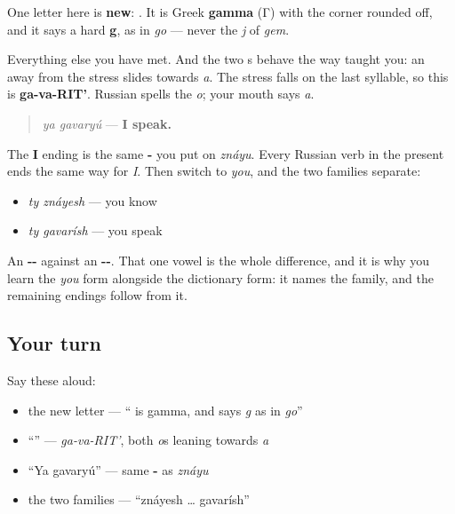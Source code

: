 One letter here is \textbf{new}: \textbf{}. It is Greek \textbf{gamma} (Γ) with the corner rounded off, and it says a hard \textbf{g}, as in \emph{go} — never the \emph{j} of \emph{gem}.

Everything else you have met. And the two \textbf{}s behave the way \emph{} taught you: an \textbf{} away from the stress slides towards \emph{a}. The stress falls on the last syllable, so this is \textbf{ga-va-RIT'}. Russian spells the \emph{o}; your mouth says \emph{a}.

\begin{grammarlens}[title={Grammar Lens: verbs come in two families}]
\begin{quote}
\emph{ya gavaryú} — \textbf{I speak.}
\end{quote}

The \textbf{I} ending is the same \textbf{-} you put on \emph{znáyu}. Every Russian verb in the present ends the same way for \emph{I}. Then switch to \emph{you}, and the two families separate:

\begin{itemize}
\raggedright
  \item \emph{ty znáyesh} — you know
  \item \emph{ty gavarísh} — you speak
\end{itemize}

An \textbf{--} against an \textbf{--}. That one vowel is the whole difference, and it is why you learn the \emph{you} form alongside the dictionary form: it names the family, and the remaining endings follow from it.
\end{grammarlens}

\subsection*{Your turn}
Say these aloud:

\begin{itemize}
\raggedright
  \item the new letter — \textquotedblleft{}\textbf{} is gamma, and says \emph{g} as in \emph{go}\textquotedblright{}
  \item \textquotedblleft{}\textquotedblright{} — \emph{ga-va-RIT'}, both \emph{o}s leaning towards \emph{a}
  \item \textquotedblleft{}Ya gavaryú\textquotedblright{} — same \textbf{-} as \emph{znáyu}
  \item the two families — \textquotedblleft{}znáyesh … gavarísh\textquotedblright{}
\end{itemize}

